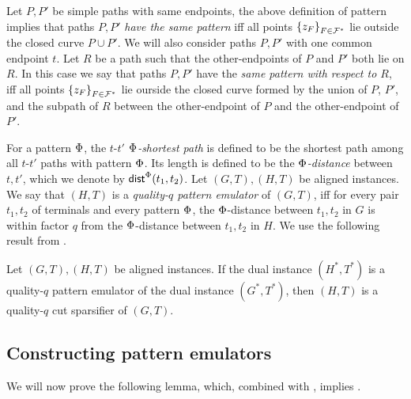 Let $P,P'$ be simple paths with same endpoints, the above definition of pattern implies that paths $P,P'$ \emph{have the same pattern} iff all points $\left\{ z_F \right\}_{F\in {\mathcal{F}}^*}$ lie outside the closed curve $P\cup P'$.
We will also consider paths $P,P'$ with one common endpoint $t$. Let $R$ be a path such that the other-endpoints of $P$ and $P'$ both lie on $R$. In this case we say that paths $P,P'$ have the \emph{same pattern with respect to $R$}, iff all points $\left\{ z_F \right\}_{F\in {\mathcal{F}}^*}$ lie ourside the closed curve formed by the union of $P$, $P'$, and the subpath of $R$ between the other-endpoint of $P$ and the other-endpoint of $P'$.

For a pattern $\Phi$, the $t$-$t'$ \emph{$\Phi$-shortest path} is defined to be the shortest path among all $t$-$t'$ paths with pattern $\Phi$. Its length is defined to be the \emph{$\Phi$-distance} between $t,t'$, which we denote by $\textnormal{\textsf{dist}}^{\Phi}(t_1,t_2)$.
Let $(G,T), (H,T)$ be aligned instances. We say that $(H,T)$ is a \emph{quality-$q$ pattern emulator} of $(G,T)$, iff for every pair $t_1,t_2$ of terminals and every pattern $\Phi$, the $\Phi$-distance between $t_1,t_2$ in $G$ is within factor $q$ from the $\Phi$-distance between $t_1,t_2$ in $H$.
We use the following result from \cite{krauthgamer2017refined}.

\begin{theorem}
\label{thm: pattern for cut}
Let $(G,T),(H,T)$ be aligned instances. If the dual instance $(H^*,T^*)$ is a quality-$q$ pattern emulator of the dual instance $(G^*,T^*)$, then $(H,T)$ is a quality-$q$ cut sparsifier of $(G,T)$.
\end{theorem}




\subsection{Constructing pattern emulators}

We will now prove the following lemma, which, combined with , implies .

